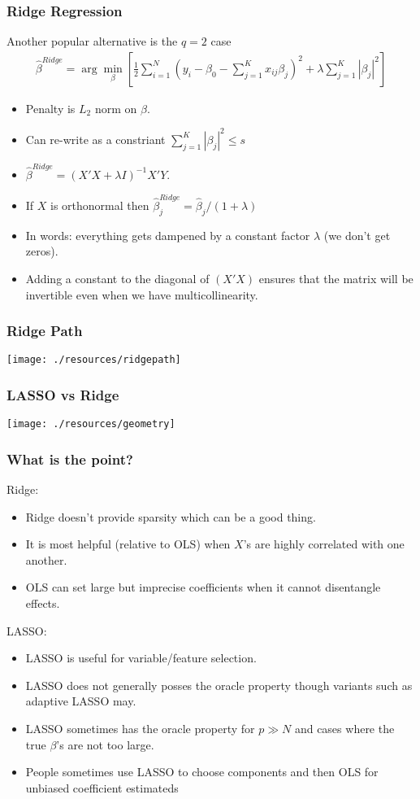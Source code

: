 \documentclass[xcolor=pdftex,dvipsnames,table,mathserif,aspectratio=169]{beamer}
\begin{document}
\begin{frame}
\frametitle{Ridge Regression}
Another popular alternative is the $q=2$ case
\begin{eqnarray*}
\hat{\beta}^{Ridge} = \arg \min_{\beta} \left[\frac{1}{2} \sum_{i=1}^N (y_i - \beta_0 - \sum_{j=1}^K x_{ij} \beta_j)^2 + \lambda \sum_{j=1}^K | \beta_j|^2 \right]
\end{eqnarray*}
\begin{itemize}
\item Penalty is $L_2$ norm on $\beta$.
\item Can re-write as a constriant  $\sum_{j=1}^K | \beta_j|^2 \leq s$
\item $\hat{\beta}^{Ridge} = (X'X + \lambda I )^{-1} X' Y$.
\item If $X$ is orthonormal then $\hat{\beta}_{j}^{Ridge} =  \hat{\beta}_j /(1 +\lambda )$
\item In words: everything gets dampened by a constant factor $\lambda$ (we don't get zeros).
\item Adding a constant to the diagonal of $(X'X)$ ensures that the matrix will be invertible even when we have multicollinearity.
\end{itemize}
\end{frame}

\begin{frame}
\frametitle{Ridge Path}
\begin{center}
\texttt{[image: ./resources/ridgepath]}
\end{center}
\end{frame}

\begin{frame}
\frametitle{LASSO vs Ridge}
\begin{center}
\texttt{[image: ./resources/geometry]}
\end{center}
\end{frame}

\begin{frame}
\frametitle{What is the point?}
Ridge:
\begin{itemize}
\item Ridge doesn't provide sparsity which can be a good thing.
\item It is most helpful (relative to OLS) when $X$'s are highly correlated with one another.
\item OLS can set large but imprecise coefficients when it cannot disentangle effects.
\end{itemize}
LASSO:
\begin{itemize}
\item LASSO is useful for variable/feature selection.
\item LASSO does not generally posses the \alert{oracle property} though variants such as \alert{adaptive LASSO} may.
\item LASSO sometimes has the oracle property for $p \gg N$ and cases where the true $\beta$'s are not too large.
\item People sometimes use LASSO to choose components and then OLS for unbiased coefficient estimateds
\end{itemize}
\end{frame}
\end{document}
